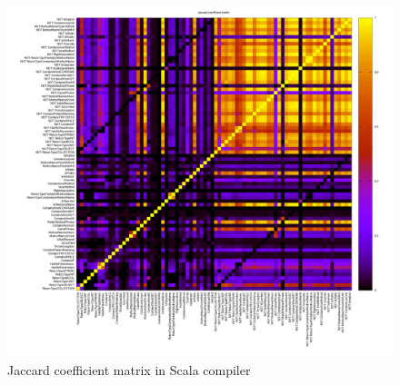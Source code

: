 \documentclass[12pt]{article}
\begin{document}
\begin{figure}[h]
\centering
\includegraphics[width=17cm]{images/corrJAC2.png}
\caption{Jaccard coefficient matrix in Scala compiler}
\label{corrJac2}
\end{figure}
\FloatBarrier
\end{document}
